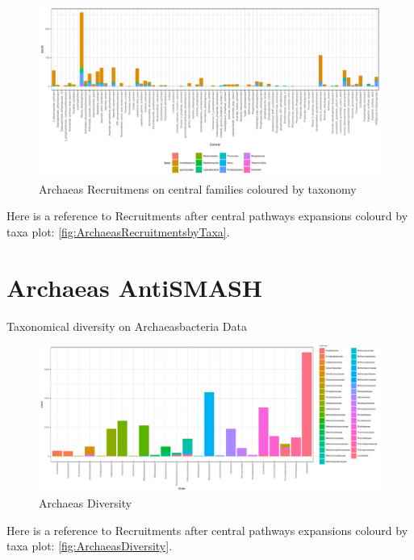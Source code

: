 \documentclass[12pt,twoside]{reedthesis}
\begin{document}
  \begin{figure}[h!tbp]
  \centering
  \includegraphics[angle = 0,scale = 0.5]{chapter2/Archaeas/ArchaeasRecruitmentsbyTaxa.pdf}
  \caption[Archaeas Recruitmens on central families coloured by taxonomy]{\normalsize{Archaeas Recruitmens on central families coloured by taxonomy}}
  \label{fig:ArchaeasRecruitmentsbyTaxa}
  \end{figure}
  
  Here is a reference to Recruitments after central pathways expansions
  colourd by taxa plot: \autoref{fig:ArchaeasRecruitmentsbyTaxa}.
  \clearpage 
  
  \section{Archaeas AntiSMASH}\label{archaeas-antismash}
  
  Taxonomical diversity on Archaeasbacteria Data
  
  \begin{figure}[h!tbp]
  \centering
  \includegraphics[angle = 0,scale = 0.6]{chapter2/Archaeas/ArchaeasDiversity.pdf}
  \caption[Archaeas Diversity]{\normalsize{Archaeas Diversity}}
  \label{fig:ArchaeasDiversity}
  \end{figure}
  
  Here is a reference to Recruitments after central pathways expansions
  colourd by taxa plot: \autoref{fig:ArchaeasDiversity}. \clearpage
  
\end{document}
